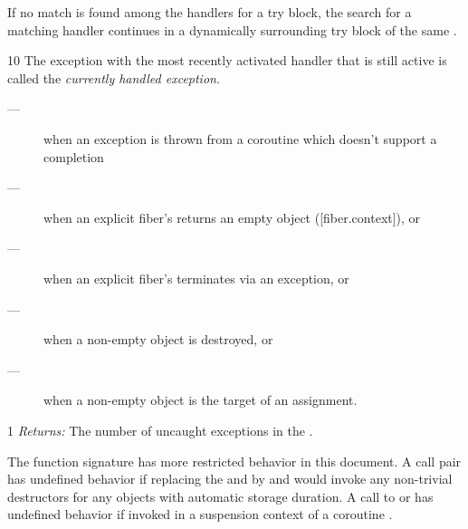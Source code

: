 
If no match is found among the handlers for a try block, the search for a
matching handler continues in a dynamically surrounding try block of the same
.


10 The exception with the most recently activated handler
 that is still active is called the
\emph{currently handled exception}.


\begin{description}
    \item[---] when an exception is thrown from a
               coroutine  which doesn’t support
               a 
               completion
\end{description}


\begin{description}
    \item[---] when an explicit fiber's \entryfn returns an empty \fiber
               object ([fiber.context]), or
    \item[---] when an explicit fiber's \entryfn terminates via an exception, or
    \item[---] when a non-empty \fiber object is destroyed, or
    \item[---] when a non-empty \fiber object is the target of an assignment.
\end{description}


1 \emph{Returns:} The number of uncaught exceptions  in the
.


The function signature  has more
restricted behavior in this document. A  call pair has
undefined behavior if replacing the  and 
by  and  would invoke any non-trivial destructors for
any objects with automatic storage duration.
A call to  or  has undefined behavior if invoked in a
suspension context of a coroutine .

